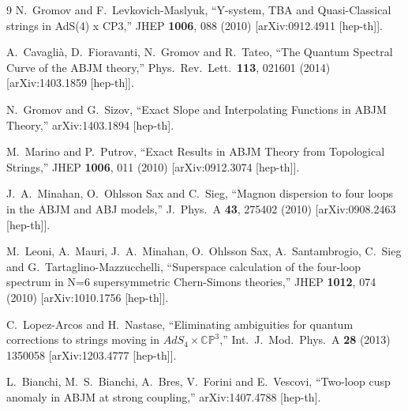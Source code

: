 \documentclass[a4paper,11pt]{article}
\numberwithin{equation}{section}
\begin{document}
\begin{thebibliography} {9}
  N.~Gromov and F.~Levkovich-Maslyuk,
  ``Y-system, TBA and Quasi-Classical strings in AdS(4) x CP3,''
  JHEP {\bf 1006}, 088 (2010)
  [arXiv:0912.4911 [hep-th]].

  A.~Cavaglià, D.~Fioravanti, N.~Gromov and R.~Tateo,
  ``The Quantum Spectral Curve of the ABJM theory,''
  Phys.\ Rev.\ Lett.\  {\bf 113}, 021601 (2014)
  [arXiv:1403.1859 [hep-th]].

  N.~Gromov and G.~Sizov,
  ``Exact Slope and Interpolating Functions in ABJM Theory,''
  arXiv:1403.1894 [hep-th].

  M.~Marino and P.~Putrov,
  ``Exact Results in ABJM Theory from Topological Strings,''
  JHEP {\bf 1006}, 011 (2010)
  [arXiv:0912.3074 [hep-th]].

  J.~A.~Minahan, O.~Ohlsson Sax and C.~Sieg,
  ``Magnon dispersion to four loops in the ABJM and ABJ models,''
  J.\ Phys.\ A {\bf 43}, 275402 (2010)
  [arXiv:0908.2463 [hep-th]].

  M.~Leoni, A.~Mauri, J.~A.~Minahan, O.~Ohlsson Sax, A.~Santambrogio, C.~Sieg and G.~Tartaglino-Mazzucchelli,
  ``Superspace calculation of the four-loop spectrum in N=6 supersymmetric Chern-Simons theories,''
  JHEP {\bf 1012}, 074 (2010)
  [arXiv:1010.1756 [hep-th]].

  C.~Lopez-Arcos and H.~Nastase,
  ``Eliminating ambiguities for quantum corrections to strings moving in $AdS_4\times \mathbb{CP}^3$,''
  Int.\ J.\ Mod.\ Phys.\ A {\bf 28} (2013) 1350058
  [arXiv:1203.4777 [hep-th]].

  L.~Bianchi, M.~S.~Bianchi, A.~Bres, V.~Forini and E.~Vescovi,
  ``Two-loop cusp anomaly in ABJM at strong coupling,''
  arXiv:1407.4788 [hep-th].

  
\end{thebibliography}
  
\end{document}
